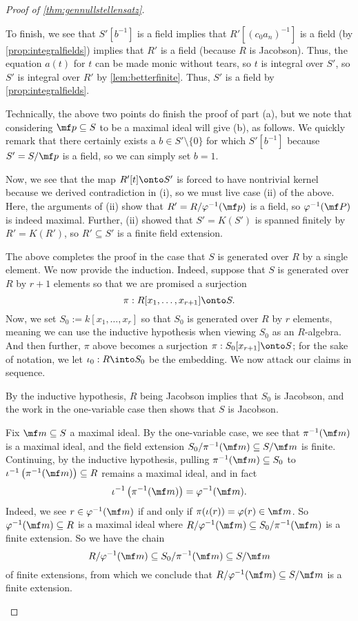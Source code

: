 \begin{proof}[Proof of \autoref{thm:gennullstellensatz}]
\begin{enumerate}[label=(\roman*)]
		To finish, we see that $S'\left[b^{-1}\right]$ is a field implies that $R'\left[(c_0a_n)^{-1}\right]$ is a field (by \autoref{prop:integralfields}) implies that $R'$ is a field (because $R$ is Jacobson). Thus, the equation $a(t)$ for $t$ can be made monic without tears, so $t$ is integral over $S'$, so $S'$ is integral over $R'$ by \autoref{lem:betterfinite}. Thus, $S'$ is a field by \autoref{prop:integralfields}.
	\end{enumerate}
	Technically, the above two points do finish the proof of part (a), but we note that considering $\mf p\subseteq S$ to be a maximal ideal will give (b), as follows. We quickly remark that there certainly exists a $b\in S'\setminus\{0\}$ for which $S'\left[b^{-1}\right]$ because $S'=S/\mf p$ is a field, so we can simply set $b=1$.
	
	Now, we see that the map $R'[t]\onto S'$ is forced to have nontrivial kernel because we derived contradiction in (i), so we must live case (ii) of the above. Here, the arguments of (ii) show that $R'=R/\varphi^{-1}(\mf p)$ is a field, so $\varphi^{-1}(\mf P)$ is indeed maximal. Further, (ii) showed that $S'=K(S')$ is spanned finitely by $R'=K(R')$, so $R'\subseteq S'$ is a finite field extension.

	The above completes the proof in the case that $S$ is generated over $R$ by a single element. We now provide the induction. Indeed, suppose that $S$ is generated over $R$ by $r+1$ elements so that we are promised a surjection
	\[\pi:R[x_1,\ldots,x_{r+1}]\onto S.\]
	Now, we set $S_0:=k[x_1,\ldots,x_r]$ so that $S_0$ is generated over $R$ by $r$ elements, meaning we can use the inductive hypothesis when viewing $S_0$ as an $R$-algebra. And then further, $\pi$ above becomes a surjection $\pi:S_0[x_{r+1}]\onto S$; for the sake of notation, we let $\iota_0:R\into S_0$ be the embedding. We now attack our claims in sequence.
	\begin{listalph}
		\item By the inductive hypothesis, $R$ being Jacobson implies that $S_0$ is Jacobson, and the work in the one-variable case then shows that $S$ is Jacobson.
		\item Fix $\mf m\subseteq S$ a maximal ideal. By the one-variable case, we see that $\pi^{-1}(\mf m)$ is a maximal ideal, and the field extension $S_0/\pi^{-1}(\mf m)\subseteq S/\mf m$ is finite. Continuing, by the inductive hypothesis, pulling $\pi^{-1}(\mf m)\subseteq S_0$ to $\iota^{-1}\left(\pi^{-1}(\mf m)\right)\subseteq R$ remains a maximal ideal, and in fact
		\[\iota^{-1}\left(\pi^{-1}(\mf m)\right)=\varphi^{-1}(\mf m).\]
		Indeed, we see $r\in\varphi^{-1}(\mf m)$ if and only if $\pi(\iota(r))=\varphi(r)\in\mf m$. So $\varphi^{-1}(\mf m)\subseteq R$ is a maximal ideal where $R/\varphi^{-1}(\mf m)\subseteq S_0/\pi^{-1}(\mf m)$ is a finite extension. So we have the chain
		\[R/\varphi^{-1}(\mf m)\subseteq S_0/\pi^{-1}(\mf m)\subseteq S/\mf m\]
		of finite extensions, from which we conclude that $R/\varphi^{-1}(\mf m)\subseteq S/\mf m$ is a finite extension.
		\qedhere
	\end{listalph}
\end{proof}

